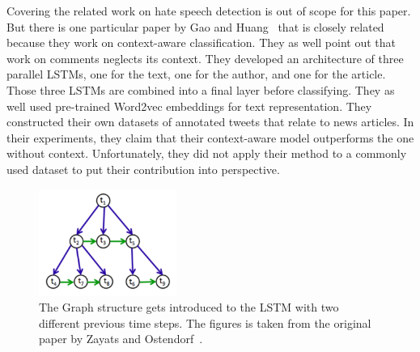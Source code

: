 Covering the related work on hate speech detection is out of scope for this paper. But there is one particular paper by Gao and Huang~\cite{Gao_2017} that is closely related because they work on context-aware classification.
They as well point out that work on comments neglects its context. They developed an architecture of three parallel LSTMs, one for the text, one for the author, and one for the article. Those three LSTMs are combined into a final layer before classifying. They as well used pre-trained Word2vec embeddings for text representation. They constructed their own datasets of annotated tweets that relate to news articles. In their experiments, they claim that their context-aware model outperforms the one without context. Unfortunately, they did not apply their method to a commonly used dataset to put their contribution into perspective.
 \begin{figure}
  \begin{center}
    \includegraphics[width=0.4\textwidth]{images/related_work/conversial_modelling.png}
  \end{center}
  \caption{The Graph structure gets introduced to the LSTM with two different previous time steps. The figures is taken from the original paper by Zayats and Ostendorf~\cite{Q18-1009}.}
   \label{fig:zayats_tree} 
\end{figure}

